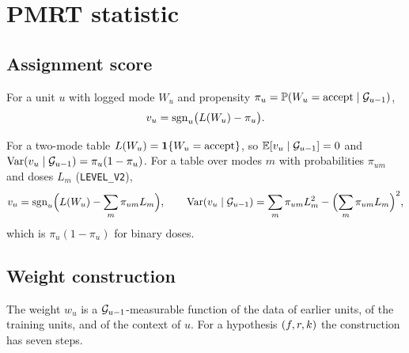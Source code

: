 \section{PMRT statistic}
\label{spec:pmrt}

\subsection{Assignment score}
\label{spec:pmrt.score}

\begin{definition}
For a unit $u$ with logged mode $W_u$ and propensity $\pi_u = \mathbb{P}(W_u = \text{accept} \mid \mathcal{G}_{u-1})$,
\begin{equation*}
v_u = \mathrm{sgn}_u \bigl( L(W_u) - \pi_u \bigr).
\end{equation*}
\end{definition}

\noindent For a two-mode table $L(W_u) = \mathbf{1}\{W_u = \text{accept}\}$, so $\mathbb{E}[v_u \mid \mathcal{G}_{u-1}] = 0$ and $\mathrm{Var}(v_u \mid \mathcal{G}_{u-1}) = \pi_u(1 - \pi_u)$. For a table over modes $m$ with probabilities $\pi_{um}$ and doses $L_m$ (\texttt{LEVEL\_V2}),
\begin{equation*}
v_u = \mathrm{sgn}_u \Bigl( L(W_u) - \sum_m \pi_{um} L_m \Bigr), \qquad
\mathrm{Var}(v_u \mid \mathcal{G}_{u-1}) = \sum_m \pi_{um} L_m^2 - \Bigl(\sum_m \pi_{um} L_m\Bigr)^{2},
\end{equation*}
which is $\pi_u(1 - \pi_u)$ for binary doses.


\subsection{Weight construction}
\label{spec:pmrt.weight}

The weight $w_u$ is a $\mathcal{G}_{u-1}$-measurable function of the data of earlier units, of the training units, and of the context of $u$. For a hypothesis $(f, r, k)$ the construction has seven steps.

